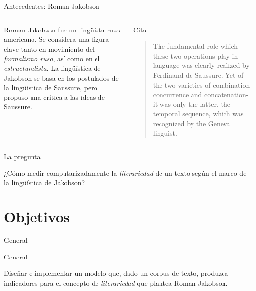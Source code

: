 \documentclass[presentation]{beamer}
\begin{document}
\begin{frame}[label={sec:org2577ff7}]{Antecedentes: Roman Jakobson}
\begin{columns}
\begin{column}{0.48\columnwidth}
Roman Jakobson fue un lingüista ruso americano. Se considera una
figura clave tanto en movimiento del \emph{formalismo ruso}, así como
en el \emph{estructuralista}.  La lingüística de Jakobson se basa en
los postulados de la lingüistica de Saussure, \alert{pero} propuso una
crítica a las ideas de Saussure.
\end{column}


\begin{column}{0.48\columnwidth}
\begin{block}{Cita}
\begin{quote}
The fundamental role which these two operations play in language
was clearly realized by Ferdinand de Saussure. Yet of the two
varieties of combination-concurrence and concatenation-it was only
the latter, the temporal sequence, which was recognized by the
Geneva linguist. 
\cite[99]{jakobson1956two}
\end{quote}
\end{block}
\end{column}
\end{columns}
\end{frame}




\begin{frame}[label={sec:org41ea3bd}]{La pregunta}
\begin{block}{}
   ¿Cómo medir
   computarizadamente la \emph{literariedad} de un texto según el marco de la
   lingüística de Jakobson?
\end{block}
\end{frame}


\section{Objetivos}
\label{sec:org9a34753}
\begin{frame}[label={sec:orgd880c7f}]{General}
   \begin{block}{General}

Diseñar e implementar un modelo que, dado un corpus de texto, produzca
   indicadores para el concepto de \emph{literariedad} que plantea Roman Jakobson.
     \end{block}
\end{frame}
\end{document}
